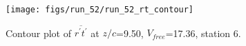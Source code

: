 \begin{figure}[H]
\centering
\texttt{[image: figs/run\_52/run\_52\_rt\_contour]}
\caption{Contour plot of $\overline{r^\prime t^\prime}$ at $z/c$=9.50, $V_{free}$=17.36, station 6.}
\end{figure}


